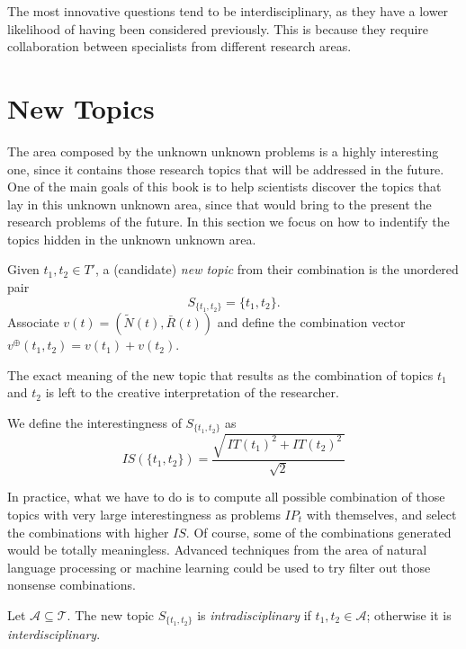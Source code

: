 The most innovative questions tend to be interdisciplinary, as they have a lower likelihood of having been considered previously. This is because they require collaboration between specialists from different research areas. 

%
%
\section{New Topics}
\label{sec:new-topics}

The area composed by the unknown unknown problems is a highly interesting one, since it contains those research topics that will be addressed in the future. One of the main goals of this book is to help scientists discover the topics that lay in this unknown unknown area, since that would bring to the present the research problems of the future. In this section we focus on how to indentify the topics hidden in the unknown unknown area.

\begin{definition}
Given $t_1,t_2\in T'$, a (candidate) \emph{new topic} from their combination is the unordered pair
\[
S_{\{t_1,t_2\}}=\{t_1,t_2\}.
\]
Associate $v(t)=(\tilde{N}(t),\bar{R}(t))$ and define the combination vector $v^\oplus(t_1,t_2)=v(t_1)+v(t_2)$.
\end{definition}

The exact meaning of the new topic that results as the combination of topics $t_{1}$ and $t_{2}$ is left to the creative interpretation of the researcher.

\begin{definition}
We define the interestingness of $S_{\{t_1,t_2\}}$ as
\[
IS(\{t_1,t_2\})=\frac{\sqrt{\,IT(t_1)^2+IT(t_2)^2\,}}{\sqrt{2}}
\]

\end{definition}

In practice, what we have to do is to compute all possible combination of those topics with very large interestingness as problems $IP_{t}$ with themselves, and select the combinations with higher $IS$. Of course, some of the combinations generated would be totally meaningless. Advanced techniques from the area of natural language processing or machine learning could be used to try filter out those nonsense combinations.

\begin{definition}
Let $\mathcal{A}\subseteq\mathcal{T}$. The new topic $S_{\{t_1,t_2\}}$ is \emph{intradisciplinary} if $t_1,t_2\in\mathcal{A}$; otherwise it is \emph{interdisciplinary}.
\end{definition}

